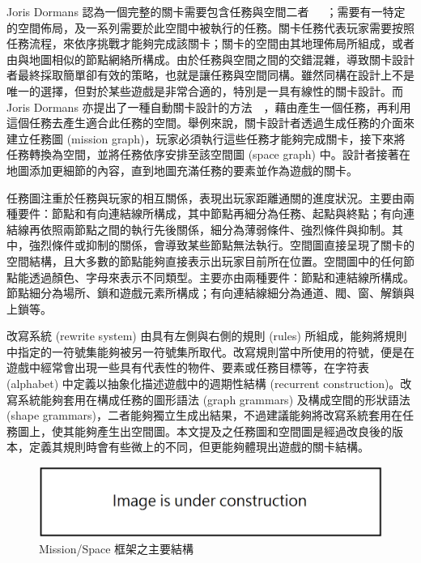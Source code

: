 Joris Dormans 認為一個完整的關卡需要包含任務與空間二者~\cite{dormans2010adventures}~\cite{dormans2011level}~\cite{dormans2012engineering}；需要有一特定的空間佈局，及一系列需要於此空間中被執行的任務。關卡任務代表玩家需要按照任務流程，來依序挑戰才能夠完成該關卡；關卡的空間由其地理佈局所組成，或者由與地圖相似的節點網絡所構成。由於任務與空間之間的交錯混雜，導致關卡設計者最終採取簡單卻有效的策略，也就是讓任務與空間同構。雖然同構在設計上不是唯一的選擇，但對於某些遊戲是非常合適的，特別是一具有線性的關卡設計。而 Joris Dormans 亦提出了一種自動關卡設計的方法~\cite{dormans2010adventures}~\cite{dormans2012engineering}，藉由產生一個任務，再利用這個任務去產生適合此任務的空間。舉例來說，關卡設計者透過生成任務的介面來建立任務圖 (mission graph)，玩家必須執行這些任務才能夠完成關卡，接下來將任務轉換為空間，並將任務依序安排至該空間圖 (space graph) 中。設計者接著在地圖添加更細節的內容，直到地圖充滿任務的要素並作為遊戲的關卡。

任務圖注重於任務與玩家的相互關係，表現出玩家距離通關的進度狀況。主要由兩種要件：節點和有向連結線所構成，其中節點再細分為任務、起點與終點；有向連結線再依照兩節點之間的執行先後關係，細分為薄弱條件、強烈條件與抑制。其中，強烈條件或抑制的關係，會導致某些節點無法執行。空間圖直接呈現了關卡的空間結構，且大多數的節點能夠直接表示出玩家目前所在位置。空間圖中的任何節點能透過顏色、字母來表示不同類型。主要亦由兩種要件：節點和連結線所構成。節點細分為場所、鎖和遊戲元素所構成；有向連結線細分為通道、閥、窗、解鎖與上鎖等。

改寫系統 (rewrite system) 由具有左側與右側的規則 (rules) 所組成，能夠將規則中指定的一符號集能夠被另一符號集所取代。改寫規則當中所使用的符號，便是在遊戲中經常會出現一些具有代表性的物件、要素或任務目標等，在字符表 (alphabet) 中定義以抽象化描述遊戲中的週期性結構 (recurrent construction)。改寫系統能夠套用在構成任務的圖形語法 (graph grammars) 及構成空間的形狀語法 (shape grammars)，二者能夠獨立生成出結果，不過建議能夠將改寫系統套用在任務圖上，使其能夠產生出空間圖。本文提及之任務圖和空間圖是經過改良後的版本，定義其規則時會有些微上的不同，但更能夠體現出遊戲的關卡結構。

\begin{figure}[ht]
  \begin{center}
    \includegraphics[width=1.0\textwidth]{figures/under_construction.png}
    \caption{Mission/Space 框架之主要結構} 
    \label{fig:structure-of-mission-space-framework}
  \end{center}
\end{figure}

